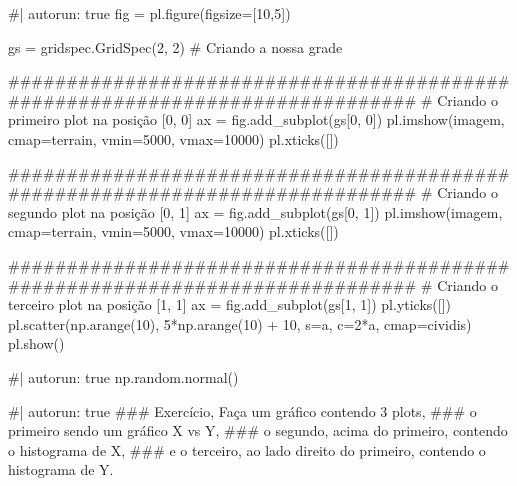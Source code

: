 \documentclass[
  letterpaper,
  DIV=11,
  numbers=noendperiod]{scrreprt}
\newenvironment{Shaded}{\begin{snugshade}}{\end{snugshade}}
\newcommand{\NormalTok}[1]{\textcolor[rgb]{0.00,0.23,0.31}{#1}}
\begin{document}
\begin{Shaded}
\begin{Highlighting}[]
\NormalTok{\#| autorun: true}
\NormalTok{fig = pl.figure(figsize=[10,5])}

\NormalTok{gs = gridspec.GridSpec(2, 2) \# Criando a nossa grade}


\NormalTok{\#\#\#\#\#\#\#\#\#\#\#\#\#\#\#\#\#\#\#\#\#\#\#\#\#\#\#\#\#\#\#\#\#\#\#\#\#\#\#\#\#\#\#\#\#\#\#\#\#\#\#\#\#\#\#\#\#\#\#\#\#\#\#\#\#\#\#\#\#\#\#\#\#\#\#\#\#\#}
\NormalTok{\# Criando o primeiro plot na posição [0, 0]}
\NormalTok{ax = fig.add\_subplot(gs[0, 0])}
\NormalTok{pl.imshow(imagem, cmap=\textquotesingle{}terrain\textquotesingle{}, vmin=5000, vmax=10000)}
\NormalTok{pl.xticks([])}

\NormalTok{\#\#\#\#\#\#\#\#\#\#\#\#\#\#\#\#\#\#\#\#\#\#\#\#\#\#\#\#\#\#\#\#\#\#\#\#\#\#\#\#\#\#\#\#\#\#\#\#\#\#\#\#\#\#\#\#\#\#\#\#\#\#\#\#\#\#\#\#\#\#\#\#\#\#\#\#\#\#}
\NormalTok{\# Criando o segundo plot na posição [0, 1]}
\NormalTok{ax = fig.add\_subplot(gs[0, 1])}
\NormalTok{pl.imshow(imagem, cmap=\textquotesingle{}terrain\textquotesingle{}, vmin=5000, vmax=10000)}
\NormalTok{pl.xticks([])}

\NormalTok{\#\#\#\#\#\#\#\#\#\#\#\#\#\#\#\#\#\#\#\#\#\#\#\#\#\#\#\#\#\#\#\#\#\#\#\#\#\#\#\#\#\#\#\#\#\#\#\#\#\#\#\#\#\#\#\#\#\#\#\#\#\#\#\#\#\#\#\#\#\#\#\#\#\#\#\#\#\#}
\NormalTok{\# Criando o terceiro plot na posição [1, 1]}
\NormalTok{ax = fig.add\_subplot(gs[1, 1])}
\NormalTok{pl.yticks([])}
\NormalTok{pl.scatter(np.arange(10), 5*np.arange(10) + 10, s=a, c=2*a, cmap=\textquotesingle{}cividis\textquotesingle{})}
\NormalTok{pl.show()}
\end{Highlighting}
\end{Shaded}

\begin{Shaded}
\begin{Highlighting}[]
\NormalTok{\#| autorun: true}
\NormalTok{np.random.normal()}
\end{Highlighting}
\end{Shaded}

\begin{Shaded}
\begin{Highlighting}[]
\NormalTok{\#| autorun: true}
\NormalTok{\#\#\# Exercício, Faça um gráfico contendo 3 plots, }
\NormalTok{\#\#\# o primeiro sendo um gráfico X vs Y, }
\NormalTok{\#\#\# o segundo, acima do primeiro, contendo o histograma de X, }
\NormalTok{\#\#\# e o terceiro, ao lado direito do primeiro, contendo o histograma de Y.}
\end{Highlighting}
\end{Shaded}
\end{document}
